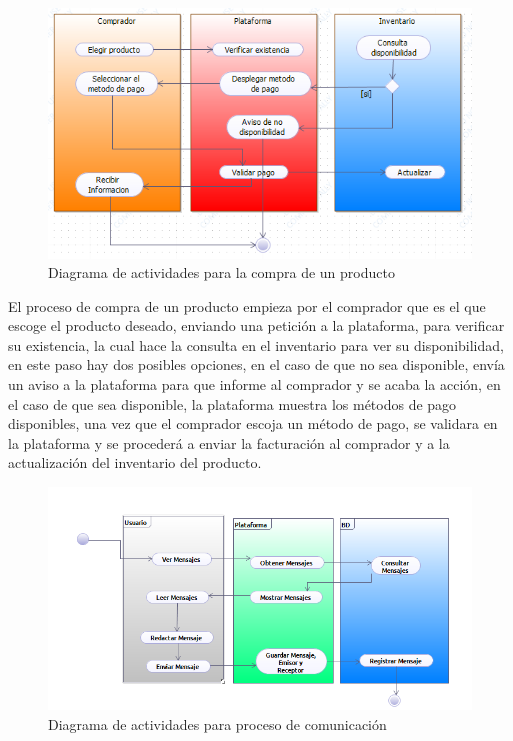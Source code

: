 \begin{figure}[th!]
	\centering
	\includegraphics[width=1\linewidth]{arquitectura/imagenes/workflow}
	\caption{Diagrama de actividades para la compra de un producto}
	\label{fig:workflow}
\end{figure}


El proceso de compra de un producto empieza por el comprador que es el que escoge el producto deseado, enviando una petición a la plataforma, para verificar su existencia, la cual hace la consulta en el inventario para ver su disponibilidad, en este paso hay dos posibles opciones, en el caso de que no sea disponible, envía un aviso a la plataforma para que informe al comprador y se acaba la acción, en el caso de que sea disponible, la plataforma muestra los métodos de pago disponibles, una vez que el comprador escoja un método de pago, se validara en la plataforma y se procederá a enviar la facturación al comprador y a la actualización del inventario del producto.

\begin{figure}[th!]
	\centering
	\includegraphics[width=1\linewidth]{arquitectura/imagenes/workflowMensajes}
	\caption{Diagrama de actividades para proceso de comunicación}
	\label{fig:workflowMensajes}
\end{figure}

